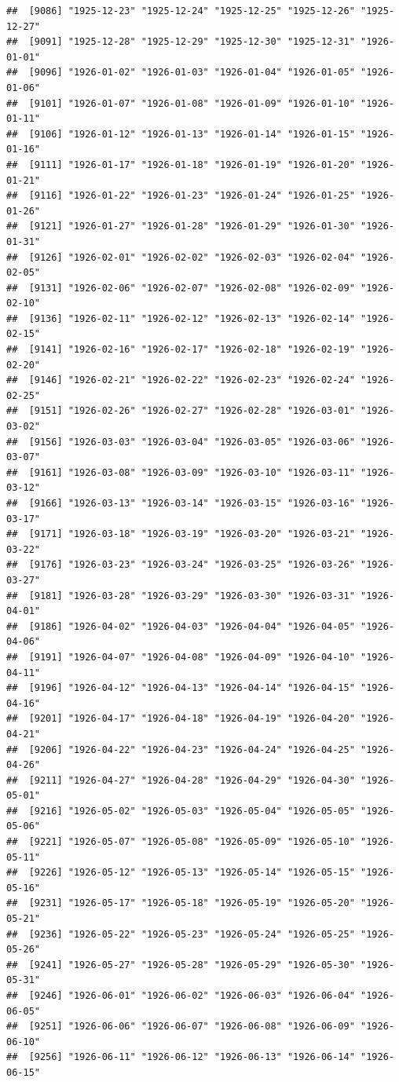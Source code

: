 \documentclass{article}\usepackage[]{graphicx}\usepackage[]{color}
\makeatletter
\newenvironment{kframe}{%
 \def\at@end@of@kframe{}%
 \ifinner\ifhmode%
  \def\at@end@of@kframe{\end{minipage}}%
  \begin{minipage}{\columnwidth}%
 \fi\fi%
 \def\FrameCommand##1{\hskip\@totalleftmargin \hskip-\fboxsep
 \colorbox{shadecolor}{##1}\hskip-\fboxsep
     \hskip-\linewidth \hskip-\@totalleftmargin \hskip\columnwidth}%
 \MakeFramed {\advance\hsize-\width
   \@totalleftmargin\z@ \linewidth\hsize
   \@setminipage}}%
 {\par\unskip\endMakeFramed%
 \at@end@of@kframe}
\newenvironment{knitrout}{}{} %
\makeatother
\begin{document}
\begin{description}
\begin{knitrout}
\begin{kframe}
\begin{verbatim}
##  [9086] "1925-12-23" "1925-12-24" "1925-12-25" "1925-12-26" "1925-12-27"
##  [9091] "1925-12-28" "1925-12-29" "1925-12-30" "1925-12-31" "1926-01-01"
##  [9096] "1926-01-02" "1926-01-03" "1926-01-04" "1926-01-05" "1926-01-06"
##  [9101] "1926-01-07" "1926-01-08" "1926-01-09" "1926-01-10" "1926-01-11"
##  [9106] "1926-01-12" "1926-01-13" "1926-01-14" "1926-01-15" "1926-01-16"
##  [9111] "1926-01-17" "1926-01-18" "1926-01-19" "1926-01-20" "1926-01-21"
##  [9116] "1926-01-22" "1926-01-23" "1926-01-24" "1926-01-25" "1926-01-26"
##  [9121] "1926-01-27" "1926-01-28" "1926-01-29" "1926-01-30" "1926-01-31"
##  [9126] "1926-02-01" "1926-02-02" "1926-02-03" "1926-02-04" "1926-02-05"
##  [9131] "1926-02-06" "1926-02-07" "1926-02-08" "1926-02-09" "1926-02-10"
##  [9136] "1926-02-11" "1926-02-12" "1926-02-13" "1926-02-14" "1926-02-15"
##  [9141] "1926-02-16" "1926-02-17" "1926-02-18" "1926-02-19" "1926-02-20"
##  [9146] "1926-02-21" "1926-02-22" "1926-02-23" "1926-02-24" "1926-02-25"
##  [9151] "1926-02-26" "1926-02-27" "1926-02-28" "1926-03-01" "1926-03-02"
##  [9156] "1926-03-03" "1926-03-04" "1926-03-05" "1926-03-06" "1926-03-07"
##  [9161] "1926-03-08" "1926-03-09" "1926-03-10" "1926-03-11" "1926-03-12"
##  [9166] "1926-03-13" "1926-03-14" "1926-03-15" "1926-03-16" "1926-03-17"
##  [9171] "1926-03-18" "1926-03-19" "1926-03-20" "1926-03-21" "1926-03-22"
##  [9176] "1926-03-23" "1926-03-24" "1926-03-25" "1926-03-26" "1926-03-27"
##  [9181] "1926-03-28" "1926-03-29" "1926-03-30" "1926-03-31" "1926-04-01"
##  [9186] "1926-04-02" "1926-04-03" "1926-04-04" "1926-04-05" "1926-04-06"
##  [9191] "1926-04-07" "1926-04-08" "1926-04-09" "1926-04-10" "1926-04-11"
##  [9196] "1926-04-12" "1926-04-13" "1926-04-14" "1926-04-15" "1926-04-16"
##  [9201] "1926-04-17" "1926-04-18" "1926-04-19" "1926-04-20" "1926-04-21"
##  [9206] "1926-04-22" "1926-04-23" "1926-04-24" "1926-04-25" "1926-04-26"
##  [9211] "1926-04-27" "1926-04-28" "1926-04-29" "1926-04-30" "1926-05-01"
##  [9216] "1926-05-02" "1926-05-03" "1926-05-04" "1926-05-05" "1926-05-06"
##  [9221] "1926-05-07" "1926-05-08" "1926-05-09" "1926-05-10" "1926-05-11"
##  [9226] "1926-05-12" "1926-05-13" "1926-05-14" "1926-05-15" "1926-05-16"
##  [9231] "1926-05-17" "1926-05-18" "1926-05-19" "1926-05-20" "1926-05-21"
##  [9236] "1926-05-22" "1926-05-23" "1926-05-24" "1926-05-25" "1926-05-26"
##  [9241] "1926-05-27" "1926-05-28" "1926-05-29" "1926-05-30" "1926-05-31"
##  [9246] "1926-06-01" "1926-06-02" "1926-06-03" "1926-06-04" "1926-06-05"
##  [9251] "1926-06-06" "1926-06-07" "1926-06-08" "1926-06-09" "1926-06-10"
##  [9256] "1926-06-11" "1926-06-12" "1926-06-13" "1926-06-14" "1926-06-15"

\end{verbatim}
\end{kframe}
\end{knitrout}
\end{description}
\end{document}
